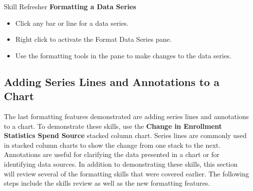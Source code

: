 \begin{center}
	\begin{sklbox}{Skill Refresher}
		\textbf{Formatting a Data Series}
		\\
		\begin{itemize}
			\setlength{\itemsep}{0pt}
			\setlength{\parskip}{0pt}
			\setlength{\parsep}{0pt}
			
			\item Click any bar or line for a data series.
			\item Right click to activate the Format Data Series pane.
			\item Use the formatting tools in the pane to make changes to the data series.
			
		\end{itemize}
	\end{sklbox}
\end{center}

\subsection{Adding Series Lines and Annotations to a Chart}

The last formatting features demonstrated are adding series lines and annotations to a chart. To demonstrate these skills, use the \textbf{Change in Enrollment Statistics Spend Source} stacked column chart. Series lines are commonly used in stacked column charts to show the change from one stack to the next. Annotations are useful for clarifying the data presented in a chart or for identifying data sources. In addition to demonstrating these skills, this section will review several of the formatting skills that were covered earlier. The following steps include the skills review as well as the new formatting features.

